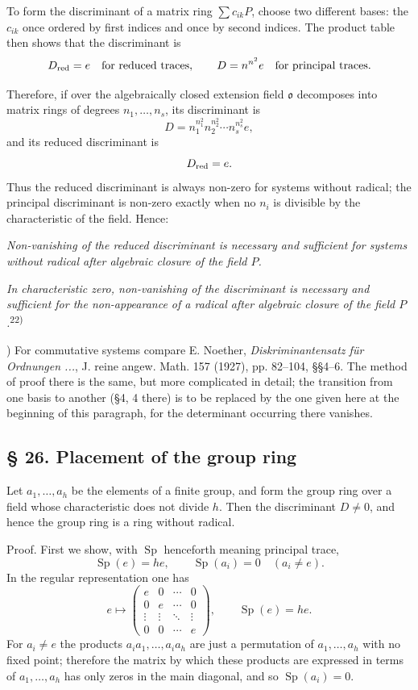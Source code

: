 \documentclass[11pt]{article}
\providecommand{\mo}{\mathfrak{o}}
\begin{document}
To form the discriminant of a matrix ring $\sum c_{ik}P$, choose two different bases: the $c_{ik}$ once ordered by first indices and once by second indices. The product table then shows that the discriminant is
\[
        D_{\rm red}=e
        \quad\hbox{for reduced traces},
        \qquad
        D=n^{n^2}e
        \quad\hbox{for principal traces}.
\]

Therefore, if over the algebraically closed extension field $\mo$ decomposes into matrix rings of degrees $n_1,\ldots,n_s$, its discriminant is
\[
        D=n_1^{n_1^2}n_2^{n_2^2}\cdots n_s^{n_s^2}e,
\]
and its reduced discriminant is
\[
        D_{\rm red}=e.
\]
Thus the reduced discriminant is always non-zero for systems without radical; the principal discriminant is non-zero exactly when no $n_i$ is divisible by the characteristic of the field. Hence:

\emph{Non-vanishing of the reduced discriminant is necessary and sufficient for systems without radical after algebraic closure of the field $P$.}

\emph{In characteristic zero, non-vanishing of the discriminant is necessary and sufficient for the non-appearance of a radical after algebraic closure of the field $P$.}\textsuperscript{22)}

{\footnotesize{}) For commutative systems compare E. Noether, \emph{Diskriminantensatz für Ordnungen ...}, J. reine angew. Math. 157 (1927), pp. 82--104, §§4--6. The method of proof there is the same, but more complicated in detail; the transition from one basis to another (§4, 4 there) is to be replaced by the one given here at the beginning of this paragraph, for the determinant occurring there vanishes.\par}

\subsection*{§ 26. Placement of the group ring}
Let $a_1,\ldots,a_h$ be the elements of a finite group, and form the group ring over a field whose characteristic does not divide $h$. Then the discriminant $D\ne0$, and hence the group ring is a ring without radical.

Proof. First we show, with $\operatorname{Sp}$ henceforth meaning principal trace,
\[
        \operatorname{Sp}(e)=he,
        \qquad
        \operatorname{Sp}(a_i)=0\quad (a_i\ne e).
\]
In the regular representation one has
\[
        e\mapsto\begin{pmatrix}e&0&\cdots&0\\0&e&\cdots&0\\\vdots&\vdots&\ddots&\vdots\\0&0&\cdots&e\end{pmatrix},
        \qquad \operatorname{Sp}(e)=he.
\]
For $a_i\ne e$ the products $a_i a_1,\ldots,a_i a_h$ are just a permutation of $a_1,\ldots,a_h$ with no fixed point; therefore the matrix by which these products are expressed in terms of $a_1,\ldots,a_h$ has only zeros in the main diagonal, and so $\operatorname{Sp}(a_i)=0$.
\end{document}

